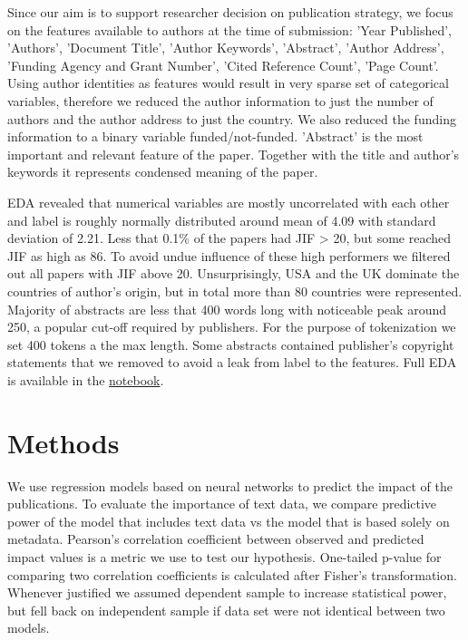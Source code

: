 \documentclass[11pt]{article}
\begin{document}
Since our aim is to support researcher decision on publication strategy, we focus on the features available to authors at the time of submission: 'Year Published', 'Authors', 'Document Title', 'Author Keywords', 'Abstract', 'Author Address', 'Funding Agency and Grant Number', 'Cited Reference Count', 'Page Count'. Using author identities as features would result in very sparse set of categorical variables, therefore we reduced the author information to just the number of authors and the author address to just the country. We also reduced the funding information to a binary variable funded/not-funded. 'Abstract' is the most important and relevant feature of the paper. Together with the title and author's keywords it represents condensed meaning of the paper.  
 
EDA revealed that numerical variables are mostly uncorrelated with each other and label is roughly normally distributed around mean of 4.09 with standard deviation of 2.21. Less that 0.1\% of the papers had JIF > 20, but some reached JIF as high as 86. To avoid undue influence of these high performers we filtered out all papers with JIF above 20. Unsurprisingly, USA and the UK dominate the countries of author's origin, but in total more than 80 countries were represented. Majority of abstracts are less that 400 words long with noticeable peak around 250, a popular cut-off required by publishers. For the purpose of tokenization we set 400 tokens a the max length. Some abstracts contained publisher's copyright statements that we removed to avoid a leak from label to the features. Full EDA is available in the \href{https://github.com/ArtemChemist/w266_project/blob/main/EDA.ipynb}{notebook}. 

\section{Methods}
We use regression models based on neural networks to predict the impact of the publications. To evaluate the importance of text data, we compare predictive power of the model that includes text data vs the model that is based solely on metadata. Pearson's correlation coefficient between observed and predicted impact values is a metric we use to test our hypothesis. One-tailed p-value for comparing two correlation coefficients is calculated after Fisher’s transformation. Whenever justified we assumed dependent sample to increase statistical power, but fell back on independent sample if data set were not identical between two models.
\end{document}
